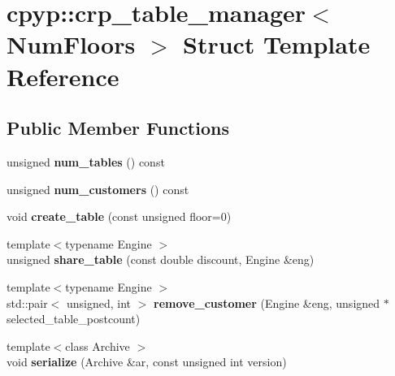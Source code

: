 \hypertarget{structcpyp_1_1crp__table__manager}{}\section{cpyp\+:\+:crp\+\_\+table\+\_\+manager$<$ Num\+Floors $>$ Struct Template Reference}
\label{structcpyp_1_1crp__table__manager}
\subsection*{Public Member Functions}
\begin{DoxyCompactItemize}
\item 
\mbox{\label{structcpyp_1_1crp__table__manager_a5f2731750cc33cd4e861657feff915c6}} 
unsigned {\bfseries num\+\_\+tables} () const
\item 
\mbox{\label{structcpyp_1_1crp__table__manager_a10df2048a6ce51f132b96faa0987930d}} 
unsigned {\bfseries num\+\_\+customers} () const
\item 
\mbox{\label{structcpyp_1_1crp__table__manager_a8581af3396eb1e9cb9e9904a978f5610}} 
void {\bfseries create\+\_\+table} (const unsigned floor=0)
\item 
\mbox{\label{structcpyp_1_1crp__table__manager_ac3a3e7854fdfe096832e3e5231e79ac2}} 
{\footnotesize template$<$typename Engine $>$ }\\unsigned {\bfseries share\+\_\+table} (const double discount, Engine \&eng)
\item 
\mbox{\label{structcpyp_1_1crp__table__manager_a12cd35b8d9deb2cc0f6edaf01bb214f3}} 
{\footnotesize template$<$typename Engine $>$ }\\std\+::pair$<$ unsigned, int $>$ {\bfseries remove\+\_\+customer} (Engine \&eng, unsigned $\ast$selected\+\_\+table\+\_\+postcount)
\item 
\mbox{\label{structcpyp_1_1crp__table__manager_acbcb670e0974df5eb62604a7ebac0ec4}} 
{\footnotesize template$<$class Archive $>$ }\\void {\bfseries serialize} (Archive \&ar, const unsigned int version)
\end{DoxyCompactItemize}
